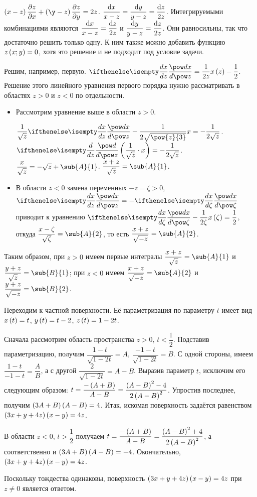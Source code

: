 \documentclass[a5paper,10pt]{article}
\begin{document}
    $\br{x - z} \parder {z} {x} + \br{\y - z} \parder {z} {y} = 2 z$.
    $\dfrac {\di x} {x - z} = \dfrac {\di y} {y - z} = \dfrac {\di z} {2z}$.
    Интегрируемыми комбинациями являются
    $\dfrac {\di x} {x - z} = \dfrac {\di z} {2z}$
    и
    $\dfrac {\di y} {y - z} = \dfrac {\di z} {2z}$. Они равносильны,
    так что достаточно решить только одну. К ним также можно добавить 
    функцию $z\left(\hspace{0.01em}x; y\hspace{0.01em}\right) = 0$, хотя это решение и не подходит под 
    условие задачи.

    Решим, например, первую.
    $\der{x}{z} = \dfrac {1} {2z} x\br{z} - \dfrac {1} {2}$.
    Решение этого линейного уравнения первого порядка нужно рассматривать 
    в областях $z > 0$ и $z < 0$ по отдельности.

    \begin{itemize}
        \item Рассмотрим уравнение выше в области $z > 0$.

        $\dfrac {1} {\sqrt{z}} \der{x}{z} -
        \dfrac {1} {2\sqrt{\pow{z}{3}}} x = -\dfrac {1} {2 \sqrt{z}}$.
        $\der{}{z} \br{\dfrac {1} {\sqrt{z}} \cdot x}
        = -\dfrac {1} {2 \sqrt{z}}$.
        $\dfrac {x} {\sqrt{z}} = -\sqrt{z} + \sub{A}{1}$.
        $\dfrac {x + z} {\sqrt{z}} = \sub{A}{1}$.

        \item В области $z < 0$ замена переменных 
        $- z = \zeta > 0$, $\der{x}{z} = -\der{x}{\zeta}$
        приводит к уравнению
        $\der{x}{\zeta} - \dfrac {1} {2\zeta} x\br{\zeta}
        = \dfrac {1} {2}$,
        откуда $\dfrac {x - \zeta} {\sqrt{\zeta}} = \sub{A}{2}$,
        то есть $\dfrac {x + z} {\sqrt{-z}} = \sub{A}{2}$.
    \end{itemize}

    Таким образом, при $z > 0$ имеем первые интегралы
    $\dfrac {x + z} {\sqrt{z}} = \sub{A}{1}$ и
    $\dfrac {y + z} {\sqrt{z}} = \sub{B}{1}$;
    при $z < 0$ имеем
    $\dfrac {x + z} {\sqrt{-z}} = \sub{A}{2}$ и
    $\dfrac {y + z} {\sqrt{-z}} = \sub{B}{2}$.

    Переходим к частной поверхности. Её параметризация по параметру 
    $t$ имеет вид $x\left(\hspace{0.01em}t\hspace{0.01em}\right) = t$, $y\left(\hspace{0.01em}t\hspace{0.01em}\right) = t - 2$, $z\left(\hspace{0.01em}t\hspace{0.01em}\right) = 1 - 2t$.

    Сначала рассмотрим область пространства $z > 0$, $t < \dfrac {1} {2}$.
    Подставив параметризацию, получим
    $\dfrac {1 - t} {\sqrt{1 - 2t}} = A$,
    $\dfrac {-1 - t} {\sqrt{1 - 2t}} = B$.
    С одной стороны, имеем 
    $\dfrac {1 - t} {-1 - t} = \dfrac {A} {B}$, а с другой
    $\dfrac {2} {\sqrt{1 - 2t}} = A - B$.
    Выразив параметр $t$, исключим его следующим образом:
    $t = \dfrac {-\left(\hspace{0.01em}A + B\hspace{0.01em}\right)} {A  - B}
    = \dfrac {\left(\hspace{0.01em}A - B\hspace{0.01em}\right)^2 - 4} {2\left(\hspace{0.01em}A - B\hspace{0.01em}\right)^2}$.
    Упростив последнее, получим $\left(\hspace{0.01em}3A + B\hspace{0.01em}\right)\left(\hspace{0.01em}A - B\hspace{0.01em}\right) = 4$.
    Итак, искомая поверхность задаётся равенством 
    $\left(\hspace{0.01em}3x + y + 4z\hspace{0.01em}\right)\left(\hspace{0.01em}x - y\hspace{0.01em}\right) = 4z$.

    В области $z < 0$, $t > \dfrac {1} {2}$ получаем
    $t = \dfrac {-\left(\hspace{0.01em}A + B\hspace{0.01em}\right)} {A  - B} = \dfrac {\left(\hspace{0.01em}A - B\hspace{0.01em}\right)^2 + 4} {2\left(\hspace{0.01em}A - B\hspace{0.01em}\right)^2}$,
    а соответственно и $\left(\hspace{0.01em}3A + B\hspace{0.01em}\right)\left(\hspace{0.01em}A - B\hspace{0.01em}\right) = -4$.
    Окончательно, $\left(\hspace{0.01em}3x + y + 4z\hspace{0.01em}\right)\left(\hspace{0.01em}x - y\hspace{0.01em}\right) = 4z$.

    Поскольку тождества одинаковы, поверхность
    $\left(\hspace{0.01em}3x + y + 4z\hspace{0.01em}\right)\left(\hspace{0.01em}x - y\hspace{0.01em}\right) = 4z$ при $z \ne 0$ является ответом.
\end{document}
